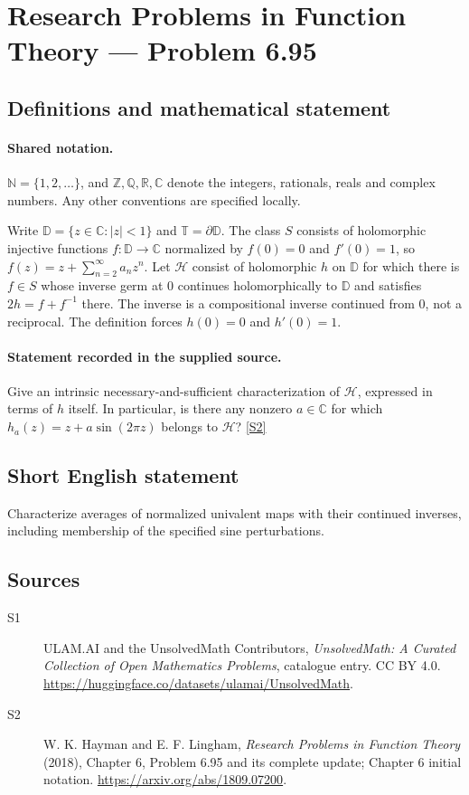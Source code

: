 \documentclass[11pt]{article}
\newcommand{\sref}[2]{\hyperlink{source:#1:#2}{[S#2]}}
\begin{document}
\section{Research Problems in Function Theory — Problem 6.95}\label{statement}

\subsection{Definitions and mathematical statement}

\paragraph{Shared notation.}$\mathbb N=\{1,2,\ldots\}$, and $\mathbb Z,\mathbb Q,\mathbb R,\mathbb C$ denote the integers, rationals, reals and complex numbers. Any other conventions are specified locally.


Write $\mathbb D=\{z\in\mathbb C:|z|<1\}$ and $\mathbb T=\partial\mathbb D$. The class $S$ consists of holomorphic injective functions $f:\mathbb D\to\mathbb C$ normalized by $f(0)=0$ and $f'(0)=1$, so $f(z)=z+\sum_{n=2}^{\infty}a_nz^n$. Let $\mathcal H$ consist of holomorphic $h$ on $\mathbb D$ for which there is $f\in S$ whose inverse germ at $0$ continues holomorphically to $\mathbb D$ and satisfies $2h=f+f^{-1}$ there. The inverse is a compositional inverse continued from $0$, not a reciprocal. The definition forces $h(0)=0$ and $h'(0)=1$.
\paragraph{Statement recorded in the supplied source.}
Give an intrinsic necessary-and-sufficient characterization of $\mathcal H$, expressed in terms of $h$ itself. In particular, is there any nonzero $a\in\mathbb C$ for which $h_a(z)=z+a\sin(2\pi z)$ belongs to $\mathcal H$? \sref{statement}{2}
\subsection{Short English statement}
Characterize averages of normalized univalent maps with their continued inverses, including membership of the specified sine perturbations.
\subsection{Sources}
\begin{description}
\item[\hypertarget{source:statement:1}{S1}] ULAM.AI and the UnsolvedMath Contributors, \emph{UnsolvedMath: A Curated Collection of Open Mathematics Problems}, catalogue entry. CC BY 4.0. \url{https://huggingface.co/datasets/ulamai/UnsolvedMath}.
\item[\hypertarget{source:statement:2}{S2}] W. K. Hayman and E. F. Lingham, \emph{Research Problems in Function Theory} (2018), Chapter 6, Problem 6.95 and its complete update; Chapter 6 initial notation. \url{https://arxiv.org/abs/1809.07200}.
\end{description}
\label{end:statement}
\end{document}
